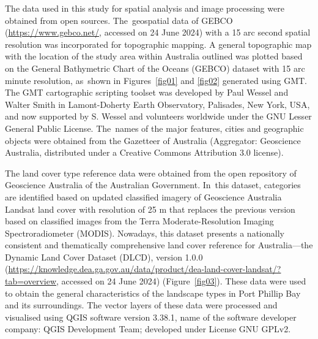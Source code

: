 \documentclass[jmse,article,accept,pdftex,oneauthor]{Definitions/mdpi}
\begin{document}
The data used in this study for spatial analysis and image processing {were} obtained from open sources. The~geospatial data of GEBCO (\href{https://www.gebco.net/}{https://www.gebco.net/}, accessed on 24 June 2024) with a 15 arc second spatial resolution was incorporated for topographic mapping. A general topographic map with the location of the study area within Australia outlined was plotted based on the General Bathymetric Chart of the Oceans (GEBCO) dataset with 15 arc minute resolution, as~shown in Figures~\ref{fig01} and \ref{fig02} generated using GMT. The GMT cartographic scripting toolset was developed by Paul Wessel and Walter Smith in Lamont-Doherty Earth Observatory, Palisades, New York, USA, and now supported by S. Wessel and volunteers worldwide under the GNU Lesser General Public License. The~names of the major features, cities and geographic objects were obtained from the Gazetteer of Australia (Aggregator: Geoscience Australia, distributed under a Creative Commons Attribution 3.0 license). 

The{ }land cover type reference data %
were obtained from the open repository of Geoscience Australia of the Australian Government{. In~this dataset, categories are identified }based on updated classified imagery of Geoscience Australia Landsat land cover with resolution of 25{ }m that replaces the previous version based on classified images from the Terra Moderate-Resolution Imaging Spectroradiometer (MODIS). {Nowadays, this dataset %
presents }a nationally consistent and thematically comprehensive land cover reference for Australia---the Dynamic Land Cover Dataset (DLCD){, }version 1.0.0 (\url{https://knowledge.dea.ga.gov.au/data/product/dea-land-cover-landsat/?tab=overview}, accessed on 24 June 2024) (Figure~\ref{fig03}). These data were used to obtain the general characteristics of the landscape types in Port Phillip Bay and its surroundings{. }The vector layers of these data were processed and visualised using QGIS software version 3.38.1, name of the software developer company: QGIS Development Team; developed under License GNU GPLv2. %
\end{document}
